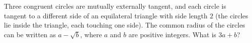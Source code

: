 Three congruent circles are mutually externally tangent, and each circle is tangent to a different side of an equilateral triangle with side length $2$ (the circles lie inside the triangle, each touching one side). The common radius of the circles can be written as $a-\sqrt b$, where $a$ and $b$ are positive integers. What is $3a+b$?
